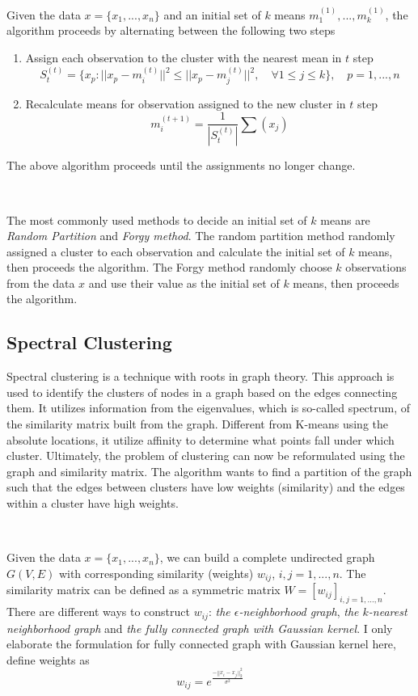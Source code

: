 \documentclass[a4paper]{article}
\begin{document}
Given the data $x = \{ x_1, ..., x_n\}$ and an initial set of $k$ means $m_1^{(1)}, ..., m_k^{(1)}$, the algorithm proceeds by alternating between the following two steps
\begin{enumerate}
	\item Assign each observation to the cluster with the nearest mean in $t$ step
		\begin{equation}
			S_t^{(t)} = \{ x_p : || x_p - m_i^{(t)} ||^2 \leq || x_p - m_j^{(t)} ||^2  , \quad \forall 1\leq j \leq k \}, \quad p = 1, ..., n
		\end{equation}
	\item Recalculate means for observation assigned to the new cluster in $t$ step
		\begin{equation}
			m_i^{(t+1)} = \frac{1}{ | S_t^{(t)} | } \sum (x_j)
		\end{equation}
\end{enumerate}
The above algorithm proceeds until the assignments no longer change.

\

The most commonly used methods to decide an initial set of $k$ means are \textit{Random Partition} and \textit{Forgy method}. The random partition method randomly assigned a cluster to each observation and calculate the initial set of $k$ means, then proceeds the algorithm. The Forgy method randomly choose $k$ observations from the data $x$ and use their value as the initial set of $k$ means, then proceeds the algorithm.

\subsection{Spectral Clustering}

Spectral clustering is a technique with roots in graph theory. This approach is used to identify the clusters of nodes in a graph based on the edges connecting them. It utilizes information from the eigenvalues, which is so-called spectrum, of the similarity matrix built from the graph. Different from K-means using the absolute locations, it utilize affinity to determine what points fall under which cluster. Ultimately, the problem of clustering can now be reformulated using the graph and similarity matrix. The algorithm wants to find a partition of the graph such that the edges between clusters have low weights (similarity) and the edges within a cluster have high weights.

\

Given the data $x = \{ x_1, ..., x_n\}$, we can build a complete undirected graph $G(V, E)$ with corresponding similarity (weights) $w_{ij}$, $i,j=1, ..., n$. The similarity matrix can be defined as a symmetric matrix $W = [w_{ij}]_{i,j=1,...,n}$. There are different ways to construct $w_{ij}$: \textit{the $\epsilon$-neighborhood graph}, \textit{the $k$-nearest neighborhood graph} and \textit{the fully connected graph with Gaussian kernel}. I only elaborate the formulation for fully connected graph with Gaussian kernel here, define weights as 
\begin{equation}
		w_{ij} = e^{\frac{- || x_i - x_j || ^2_{2}}{\sigma^2}}
\end{equation}
\end{document}
